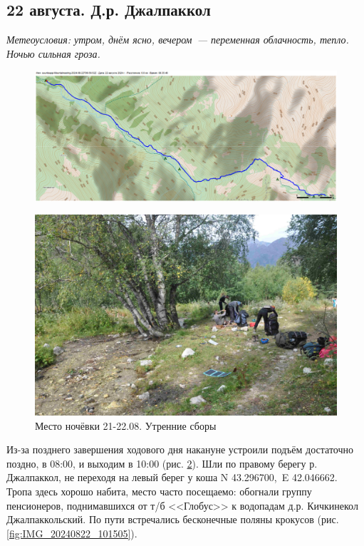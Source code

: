 \subsection{22 августа. Д.р. Джалпаккол}
\textit{Метеоусловия: утром, днём ясно, вечером~--- переменная облачность, тепло. Ночью сильная гроза.}

\begin{figure}[h!]
	\centering
	\includegraphics[angle=0, width=0.7\linewidth]{../pics/mini_maps/22}
	\label{fig:mini_22}
\end{figure}


\begin{figure}[h!]
	\centering
	\includegraphics[width=0.7\linewidth]{../pics/DSC_1181}
	\caption{Место ночёвки 21-22.08. Утренние сборы}
	\label{fig:DSC_1181}
\end{figure}


Из-за позднего завершения ходового дня накануне устроили подъём достаточно поздно, в 08:00, и выходим в 10:00 (рис. \ref{fig:DSC_1181}). Шли по правому берегу р. Джалпаккол, не переходя на левый берег у коша N 43.296700\degree,~E 42.046662\degree. Тропа здесь хорошо набита, место часто посещаемо: обогнали группу пенсионеров, поднимавшихся от т/б <<Глобус>> к водопадам д.р. Кичкинекол Джалпаккольский. По пути встречались бесконечные поляны крокусов (рис. \ref{fig:IMG_20240822_101505}).

